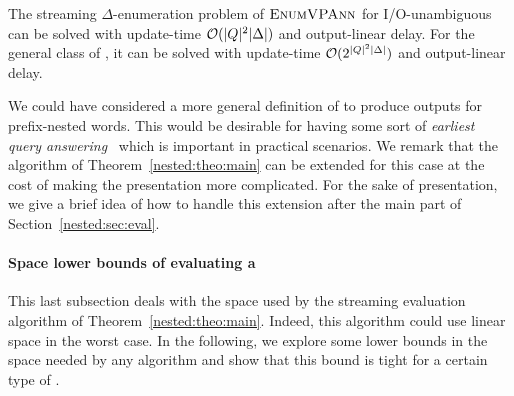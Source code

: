 \begin{theorem}\label{nested:vpawo:deltamain}
	The streaming $\Delta$-enumeration problem of $\textsc{EnumVPAnn}$ for I/O-unambiguous \vpann can be solved with update-time $\mathcal{O}(|Q|^2\vert\Delta\vert)$ and output-linear delay. For the general class of \vpann, it can be solved with update-time $\mathcal{O}(2^{|Q|^2\vert\Delta\vert})$ and output-linear \nolinebreak delay. 
\end{theorem}


We could have considered a more general definition of \vpann to produce outputs for prefix-nested words. This would be desirable for having some sort of \emph{earliest query answering}~\cite{GauwinNT09} which is important in practical scenarios. We remark that the algorithm of Theorem~\ref{nested:theo:main} can be extended for this case at the cost of making the presentation more complicated. 
For the sake of presentation, we give a brief idea of how to handle this extension after the main part of Section~\ref{nested:sec:eval}.



\paragraph{Space lower bounds of evaluating a \vpann}  
This last subsection deals with the space used by the streaming evaluation algorithm of Theorem~\ref{nested:theo:main}. 
Indeed, this algorithm could use linear space in the worst case. In the following, we explore some lower bounds in the space needed by any algorithm and show that this bound is tight for a certain type of \vpann.

